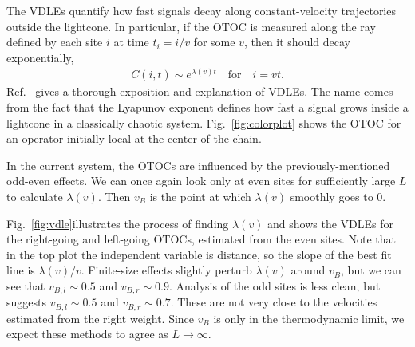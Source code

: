 \documentclass[aps,prx,reprint,superscriptaddress, longbibliography]{revtex4-1}
\newcommand{\charlie}[1]{{\color{Magenta}{{#1}}}}
\begin{document}
The VDLEs quantify how fast signals decay along constant-velocity trajectories outside the lightcone. In particular, if the OTOC is measured along the ray defined by each site $i$ at time $t_i = i/v$ for some $v$, then it should decay exponentially,
\begin{align}
	C(i, t) \sim e^{\lambda(v)t}\quad\text{for}\quad i = vt.
\end{align}
Ref.~\cite{Khemani2018lambda} gives a thorough exposition and explanation of VDLEs. The name comes from the fact that the Lyapunov exponent defines how fast a signal grows inside a lightcone in a classically chaotic system. Fig.~\ref{fig:colorplot} shows the OTOC for an operator initially local at the center of the chain.

In the current system, the OTOCs are influenced by the previously-mentioned odd-even effects. We can once again look only at even sites for sufficiently large $L$ to calculate $\lambda(v)$. Then $v_B$ is the point at which $\lambda(v)$ smoothly goes to 0.

Fig.~\ref{fig:vdle}illustrates the process of finding $\lambda(v)$ and shows the VDLEs for the right-going and left-going OTOCs, estimated from the even sites. Note that in the top plot the independent variable is distance, so the slope of the best fit line is $\lambda(v)/v$.
Finite-size effects slightly perturb $\lambda(v)$ around $v_B$, but we can see that $v_{B,l} \sim 0.5$ and $v_{B,r} \sim 0.9$. Analysis of the odd sites is less clean, but suggests $v_{B,l} \sim 0.5$ and $v_{B,r} \sim 0.7$.
These are not very close to the velocities estimated from the right weight. Since $v_B$ is \charlie{well defined} only in the thermodynamic limit, we expect these methods to agree as $L\to\infty$.
\end{document}
